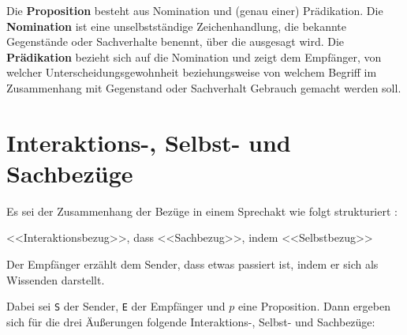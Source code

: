 Die \textbf{Proposition} besteht aus Nomination und (genau einer) Prädikation. Die \textbf{Nomination} ist eine unselbstständige Zeichenhandlung, die bekannte Gegenstände oder Sachverhalte benennt, über die ausgesagt wird. Die \textbf{Prädikation} bezieht sich auf die Nomination und zeigt dem Empfänger, von welcher Unterscheidungsgewohnheit beziehungsweise von welchem Begriff im Zusammenhang mit Gegenstand oder Sachverhalt Gebrauch gemacht werden soll. \cite[S. 22 f.]{001_MKO02_media-as-means-of-communication}

\section{Interaktions-, Selbst- und Sachbezüge}
\label{sec:02-07_interaction-self-and-factual-reference}

Es sei der Zusammenhang der Bezüge in einem Sprechakt wie folgt strukturiert \cite[S. 22]{001_MKO02_media-as-means-of-communication}: 

\begin{center}
    \textless\textless Interaktionsbezug\textgreater\textgreater, dass \textless\textless Sachbezug\textgreater\textgreater, indem \textless\textless Selbstbezug\textgreater\textgreater
\end{center}

Der Empfänger erzählt dem Sender, dass etwas passiert ist, indem er sich als Wissenden darstellt.

Dabei sei \texttt{S} der Sender, \texttt{E} der Empfänger und \texttt{$p$} eine Proposition. Dann ergeben sich für die drei Äußerungen folgende Interaktions-, Selbst- und Sachbezüge:

